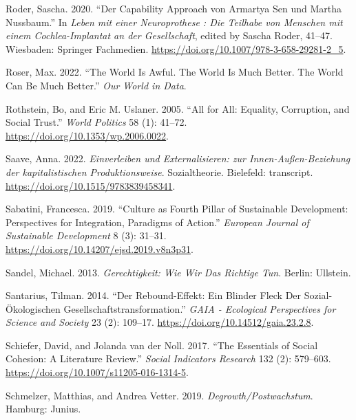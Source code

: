 \documentclass[
  a4paper,
  openany]{book}
\newlength{\cslhangindent}
\newenvironment{CSLReferences}[2] %
 {\begin{list}{}{%
  \setlength{\itemindent}{0pt}
  \setlength{\leftmargin}{0pt}
  \setlength{\parsep}{0pt}
  \ifodd #1
   \setlength{\leftmargin}{\cslhangindent}
   \setlength{\itemindent}{-1\cslhangindent}
  \fi
  \setlength{\itemsep}{#2\baselineskip}}}
 {\end{list}}
\begin{document}
\begin{CSLReferences}{1}{0}
Roder, Sascha. 2020. {``{Der Capability Approach von Armartya Sen und
Martha Nussbaum}.''} In \emph{{Leben mit einer Neuroprothese : Die
Teilhabe von Menschen mit einem Cochlea-Implantat an der Gesellschaft}},
edited by Sascha Roder, 41--47. Wiesbaden: Springer Fachmedien.
\url{https://doi.org/10.1007/978-3-658-29281-2_5}.

Roser, Max. 2022. {``The World Is Awful. {The} World Is Much Better.
{The} World Can Be Much Better.''} \emph{Our World in Data}.

Rothstein, Bo, and Eric M. Uslaner. 2005. {``All for {All}: {Equality},
{Corruption}, and {Social Trust}.''} \emph{World Politics} 58 (1):
41--72. \url{https://doi.org/10.1353/wp.2006.0022}.

Saave, Anna. 2022. \emph{{Einverleiben und Externalisieren: zur
Innen-Au{ß}en-Beziehung der kapitalistischen Produktionsweise}}.
{Sozialtheorie}. Bielefeld: transcript.
\url{https://doi.org/10.1515/9783839458341}.

Sabatini, Francesca. 2019. {``Culture as {Fourth Pillar} of {Sustainable
Development}: {Perspectives} for {Integration}, {Paradigms} of
{Action}.''} \emph{European Journal of Sustainable Development} 8 (3):
31--31. \url{https://doi.org/10.14207/ejsd.2019.v8n3p31}.

Sandel, Michael. 2013. \emph{Gerechtigkeit: {Wie} Wir Das {Richtige}
Tun}. Berlin: Ullstein.

Santarius, Tilman. 2014. {``Der {Rebound-Effekt}: Ein Blinder {Fleck}
Der Sozial-{Ö}kologischen {Gesellschaftstransformation}.''} \emph{GAIA -
Ecological Perspectives for Science and Society} 23 (2): 109--17.
\url{https://doi.org/10.14512/gaia.23.2.8}.

Schiefer, David, and Jolanda van der Noll. 2017. {``The {Essentials} of
{Social Cohesion}: {A Literature Review}.''} \emph{Social Indicators
Research} 132 (2): 579--603.
\url{https://doi.org/10.1007/s11205-016-1314-5}.

Schmelzer, Matthias, and Andrea Vetter. 2019.
\emph{Degrowth/{Postwachstum}}. Hamburg: Junius.


\end{CSLReferences}
\end{document}
